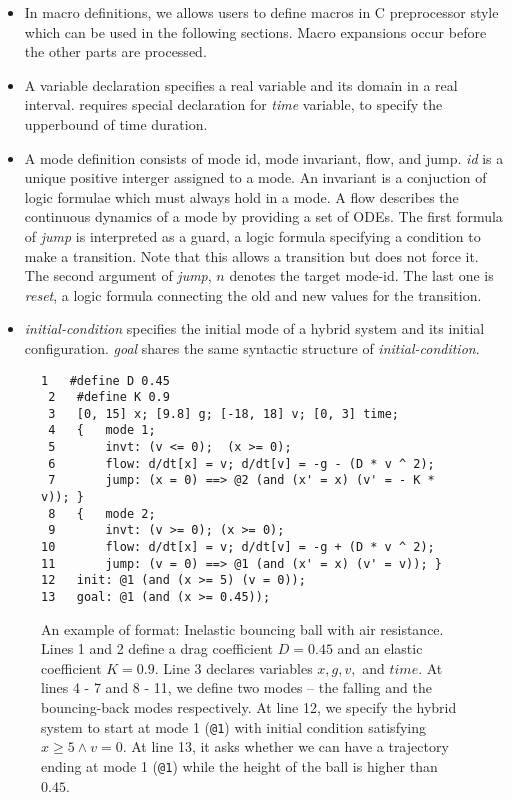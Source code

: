 \begin{itemize}
\item In macro definitions, we allows users to define macros in C
preprocessor style which can be used in the following
sections. Macro expansions occur before the other parts are processed.

\item A variable declaration specifies a real variable and its domain
  in a real interval. \dReach{} requires special declaration for
  \textit{time} variable, to specify the upperbound of time duration.

\item A mode definition consists of mode id, mode invariant, flow, and jump.
\textit{id} is a unique positive interger assigned to a mode. An
invariant is a conjuction of logic formulae which must always hold in
a mode. A flow describes the continuous dynamics of a mode by providing
a set of ODEs. The first
formula of \textit{jump} is interpreted as a guard, a logic formula
specifying a condition to make a transition. Note that this allows a
transition but does not force it. The second argument of
\textit{jump}, $n$ denotes the target mode-id. The last one is
\textit{reset}, a logic formula connecting the old and new values for
the transition.

\item \textit{initial-condition} specifies the initial mode of a hybrid
system and its initial configuration. \textit{goal} shares the same
syntactic structure of \textit{initial-condition}.
\end{itemize}
\vspace{-1.0em}
\begin{figure}
  \centering
  \begin{Verbatim}[fontfamily=courier, frame=single, framesep=1mm, fontsize=\scriptsize]
 1   #define D 0.45
 2   #define K 0.9
 3   [0, 15] x; [9.8] g; [-18, 18] v; [0, 3] time;
 4   {   mode 1;
 5       invt: (v <= 0);  (x >= 0);
 6       flow: d/dt[x] = v; d/dt[v] = -g - (D * v ^ 2);
 7       jump: (x = 0) ==> @2 (and (x' = x) (v' = - K * v)); }
 8   {   mode 2;
 9       invt: (v >= 0); (x >= 0);
10       flow: d/dt[x] = v; d/dt[v] = -g + (D * v ^ 2);
11       jump: (v = 0) ==> @1 (and (x' = x) (v' = v)); }
12   init: @1 (and (x >= 5) (v = 0));
13   goal: @1 (and (x >= 0.45));
\end{Verbatim}
\caption{An example of \drh{} format: Inelastic bouncing ball with air
  resistance. Lines 1 and 2 define a drag coefficient $D = 0.45$ and
  an elastic coefficient $K = 0.9$. Line 3 declares variables
  $x, g, v,$ and $time$. At lines 4 - 7 and 8 - 11, we define two
  modes -- the falling and the bouncing-back modes respectively. At
  line 12, we specify the hybrid system to start at mode 1
  (\texttt{@1}) with initial condition satisfying
  $x \ge 5 \land v = 0$. At line 13, it asks whether we can have
  a trajectory ending at mode 1 (\texttt{@1}) while the height of the
  ball is higher than $0.45$.}
\label{fig:bouncing-ball-drh}
\end{figure}
\vspace{-1.6em}
